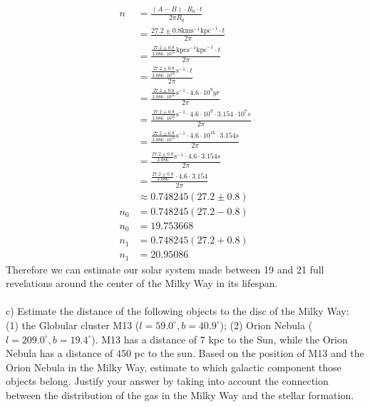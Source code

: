\begin{equation*}
  \begin{split}
    n &= \frac{(A - B) \cdot R_0 \cdot t}{2 \pi R_0}\\
      &= \frac{27.2 \pm 0.8 \text{km} \text{s}^{-1} \text{kpc}^{-1} \cdot t}{2 \pi}\\
      &= \frac{\frac{27.2 \pm 0.8}{3.086 \cdot 10^{16}} \text{kpc} \text{s}^{-1} \text{kpc}^{-1} \cdot t}{2 \pi}\\
      &= \frac{\frac{27.2 \pm 0.8}{3.086 \cdot 10^{16}} \text{s}^{-1} \cdot t}{2 \pi}\\
      &= \frac{\frac{27.2 \pm 0.8}{3.086 \cdot 10^{16}} \text{s}^{-1} \cdot 4.6 \cdot 10^9 yr}{2 \pi}\\
      &= \frac{\frac{27.2 \pm 0.8}{3.086 \cdot 10^{16}} \text{s}^{-1} \cdot 4.6 \cdot 10^9 \cdot 3.154 \cdot 10^7 s}{2 \pi}\\
      &= \frac{\frac{27.2 \pm 0.8}{3.086 \cdot 10^{16}} \text{s}^{-1} \cdot 4.6 \cdot 10^{16} \cdot 3.154 s}{2 \pi}\\
      &= \frac{\frac{27.2 \pm 0.8}{3.086} \text{s}^{-1} \cdot 4.6 \cdot 3.154 s}{2 \pi}\\
      &= \frac{\frac{27.2 \pm 0.8}{3.086} \cdot 4.6 \cdot 3.154}{2 \pi}\\
      &\approx 0.748245 (27.2 \pm 0.8)\\
  n_0 &= 0.748245 (27.2 - 0.8)\\
  n_0 &= 19.753668\\
  n_1 &= 0.748245 (27.2 + 0.8)\\
  n_1 &= 20.95086
  \end{split}
\end{equation*}
Therefore we can estimate our solar system made between 19 and 21 full revelations around the center of
the Milky Way in its lifespan.\\
\\
c) Estimate the distance of the following objects to the disc of the Milky Way: (1) the Globular cluster
M13 ($l = 59.0^{\circ}, b = 40.9^{\circ}$); (2) Orion Nebula ($l = 209.0^{\circ}, b = 19.4^{\circ}$). M13
has a distance of 7 kpc to the Sun, while the Orion Nebula has a distance of 450 pc to the sun. Based on
the position of M13 and the Orion Nebula in the Milky Way, estimate to which galactic component those
objects belong. Justify your answer by taking into account the connection between the distribution of the
gas in the Milky Way and the stellar formation.\\
\\
